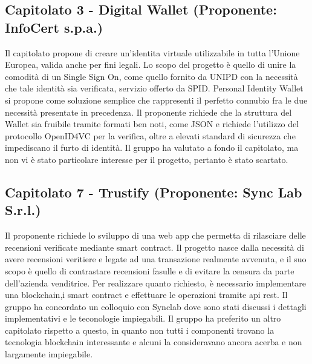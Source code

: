 \documentclass[12pt]{article}
\begin{document}
\subsection{Capitolato 3 - Digital Wallet (Proponente: InfoCert s.p.a.)}
    Il capitolato propone di creare un'identita virtuale utilizzabile in tutta l'Unione Europea, valida anche per fini legali. Lo scopo del progetto è quello di unire la comodità di un Single Sign On, come quello fornito da UNIPD con la necessità che tale identità sia verificata, servizio offerto da SPID.
    Personal Identity Wallet si propone come soluzione semplice che rappresenti il perfetto connubio fra le due necessità presentate in precedenza.
    Il proponente richiede che la struttura del Wallet sia fruibile tramite formati ben noti, come JSON e richiede l'utilizzo del protocollo OpenID4VC per la verifica, oltre a elevati standard di sicurezza che impediscano il furto di identità.
    Il gruppo ha valutato a fondo il capitolato, ma non vi è stato particolare interesse per il progetto, pertanto è stato scartato.

\subsection{Capitolato 7 - Trustify (Proponente: Sync Lab S.r.l.)}
    Il proponente richiede lo sviluppo di una web app che permetta di rilasciare delle recensioni verificate mediante smart contract. Il progetto nasce dalla necessità di avere recensioni veritiere e legate ad una transazione realmente avvenuta, e il suo scopo è quello di contrastare recensioni fasulle e di evitare la censura da parte dell'azienda venditrice.
    Per realizzare quanto richiesto, è necessario implementare una blockchain,i smart contract e effettuare le operazioni tramite api rest.
    Il gruppo ha concordato un colloquio con Synclab dove sono stati discussi i dettagli implementativi e le teconologie impiegabili.
    Il gruppo ha preferito un altro capitolato rispetto a questo, in quanto non tutti i componenti trovano la tecnologia blockchain interessante e alcuni la consideravano ancora acerba e non largamente impiegabile.
\end{document}
